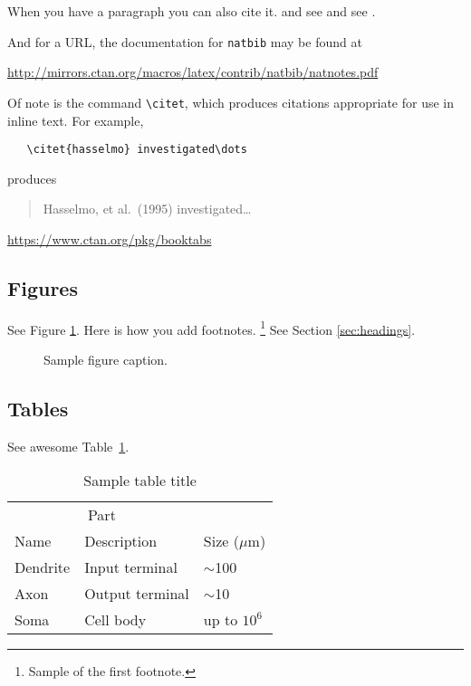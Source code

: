 \documentclass{article}
\begin{document}
\label{sec:others}
When you have a paragraph you can also cite it. \cite{Prasetia} and see \cite{Chen} and see \cite{Corral}.

And for a URL, the documentation for \verb+natbib+ may be found at
\begin{center}
  \url{http://mirrors.ctan.org/macros/latex/contrib/natbib/natnotes.pdf}
\end{center}
Of note is the command \verb+\citet+, which produces citations
appropriate for use in inline text.  For example, 
\begin{verbatim}
   \citet{hasselmo} investigated\dots
\end{verbatim}
produces
\begin{quote}
  Hasselmo, et al.\ (1995) investigated\dots
\end{quote}

\begin{center}
  \url{https://www.ctan.org/pkg/booktabs}
\end{center}


\subsection{Figures}
See Figure \ref{fig:fig1}. Here is how you add footnotes. \footnote{Sample of the first footnote.}
See Section \ref{sec:headings}.

\begin{figure}
  \centering
  \fbox{\rule[-.5cm]{4cm}{4cm} \rule[-.5cm]{4cm}{0cm}}
  \caption{Sample figure caption.}
  \label{fig:fig1}
\end{figure}


\subsection{Tables}

See awesome Table~\ref{tab:table}.

\begin{table}
 \caption{Sample table title}
  \centering
  \begin{tabular}{lll}
    \toprule
    \multicolumn{2}{c}{Part}                   \\
    \cmidrule(r){1-2}
    Name     & Description     & Size ($\mu$m) \\
    \midrule
    Dendrite & Input terminal  & $\sim$100     \\
    Axon     & Output terminal & $\sim$10      \\
    Soma     & Cell body       & up to $10^6$  \\
    \bottomrule
  \end{tabular}
  \label{tab:table}
\end{table}




\end{document}
